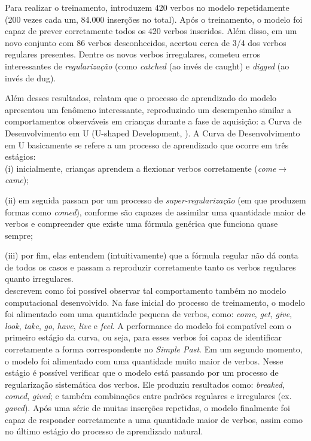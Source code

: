 Para realizar o treinamento, \cite{rumelhart:1986} introduzem 420 verbos no modelo repetidamente (200 vezes cada um, 84.000 inserções no total).  Após o treinamento, o modelo foi capaz de prever corretamente todos os 420 verbos inseridos. Além disso, em um novo conjunto com 86 verbos desconhecidos, acertou cerca de 3/4 dos verbos regulares presentes. Dentre os novos verbos irregulares, cometeu erros interessantes de \textit{regularização} (como \textit{catched} (ao invés de caught) e \textit{digged} (ao invés de dug). %

Além desses resultados, \cite{rumelhart:1986} relatam que o processo de aprendizado do modelo apresentou um fenômeno interessante, reproduzindo um desempenho similar a comportamentos observáveis em crianças durante a fase de aquisição: a Curva de Desenvolvimento em U (U-shaped Development, \cite{marcus:1992}). A Curva de Desenvolvimento em U basicamente se refere a um processo de aprendizado que ocorre em três estágios: \\

(i) inicialmente, crianças aprendem a flexionar verbos corretamente (\textit{come}$\rightarrow$\textit{came});

(ii) em seguida passam por um processo de \textit{super-regularização} (em que produzem formas como \textit{comed}), conforme são capazes de assimilar uma quantidade maior de verbos e compreender que existe uma fórmula genérica que funciona quase sempre;

(iii) por fim, elas entendem (intuitivamente) que a fórmula regular não dá conta de todos os casos e passam a reproduzir corretamente tanto os verbos regulares quanto irregulares. \\


\cite{rumelhart:1986} descrevem como foi possível observar tal comportamento também no modelo computacional desenvolvido.
Na fase inicial do processo de treinamento, o modelo foi alimentado com uma quantidade pequena de verbos, como: \textit{come}, \textit{get}, \textit{give}, \textit{look}, \textit{take}, \textit{go}, \textit{have}, \textit{live} e \textit{feel}. A performance do modelo foi compatível com o primeiro estágio da curva, ou seja, para esses verbos foi capaz de identificar corretamente a forma correspondente no \textit{Simple Past}. Em um segundo momento, o modelo foi alimentado com uma quantidade muito maior de verbos. Nesse estágio é possível verificar que o modelo está passando por um processo de regularização sistemática dos verbos. Ele produziu resultados como: \textit{breaked}, \textit{comed}, \textit{gived}; e também combinações entre padrões regulares e irregulares (ex. \textit{gaved}). 
Após uma série de muitas inserções repetidas, o modelo finalmente foi capaz de responder corretamente a uma quantidade maior de verbos, assim como no último estágio do processo de aprendizado natural. 

